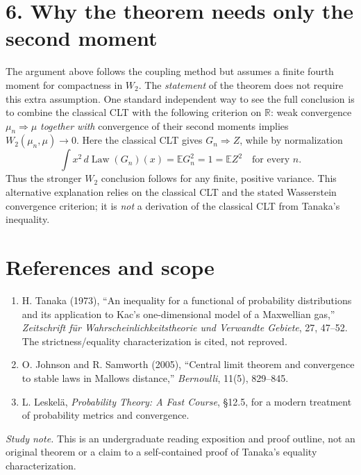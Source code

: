 \documentclass[10pt,a4paper]{article}
\newcommand{\Law}{\operatorname{Law}}
\newcommand{\E}{\mathbb E}
\begin{document}
\section*{6. Why the theorem needs only the second moment}
The argument above follows the coupling method but assumes a finite fourth moment for compactness in $W_2$. The \emph{statement} of the theorem does not require this extra assumption. One standard independent way to see the full conclusion is to combine the classical CLT with the following criterion on $\mathbb R$: weak convergence $\mu_n\Rightarrow\mu$ \emph{together with} convergence of their second moments implies $W_2(\mu_n,\mu)\to0$. Here the classical CLT gives $G_n\Rightarrow Z$, while by normalization
\[
\int x^2\,d\Law(G_n)(x)=\E G_n^2=1=\E Z^2
\quad\text{for every }n.
\]
Thus the stronger $W_2$ conclusion follows for any finite, positive variance. This alternative explanation relies on the classical CLT and the stated Wasserstein convergence criterion; it is \emph{not} a derivation of the classical CLT from Tanaka's inequality.

\section*{References and scope}
\begin{enumerate}[leftmargin=*]
\item H. Tanaka (1973), ``An inequality for a functional of probability distributions and its application to Kac's one-dimensional model of a Maxwellian gas,'' \emph{Zeitschrift f\"ur Wahrscheinlichkeitstheorie und Verwandte Gebiete}, 27, 47--52. The strictness/equality characterization is cited, not reproved.
\item O. Johnson and R. Samworth (2005), ``Central limit theorem and convergence to stable laws in Mallows distance,'' \emph{Bernoulli}, 11(5), 829--845.
\item L. Leskel\"a, \emph{Probability Theory: A Fast Course}, \S12.5, for a modern treatment of probability metrics and convergence.
\end{enumerate}
\textit{Study note.} This is an undergraduate reading exposition and proof outline, not an original theorem or a claim to a self-contained proof of Tanaka's equality characterization.
\end{document}
